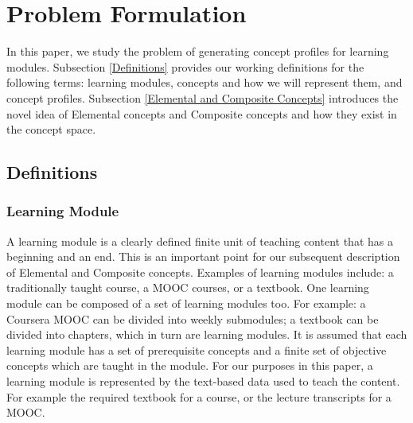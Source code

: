 \section{Problem Formulation}



In this paper, we study the problem of generating concept profiles for learning modules. Subsection \ref{Definitions} provides our working definitions for the following terms: learning modules, concepts and how we will represent them, and concept profiles. Subsection \ref{Elemental and Composite Concepts} introduces the novel idea of Elemental concepts and Composite concepts and how they exist in the concept space.

\subsection{Definitions}
\subsubsection{Learning Module}
A learning module is a clearly defined finite unit of teaching content that has a beginning and an end. This is an important point for our subsequent description of Elemental and Composite concepts. Examples of learning modules include: a traditionally taught course, a MOOC courses, or a textbook. One learning module can be composed of a set of learning modules too. For example: a Coursera MOOC can be divided into weekly submodules; a textbook can be divided into chapters, which in turn are learning modules.
It is assumed that each learning module has a set of prerequisite concepts and a finite set of objective concepts which are taught in the module.
For our purposes in this paper, a learning module is represented by the text-based data used to teach the content. For example the required textbook for a course, or the lecture transcripts for a MOOC.
